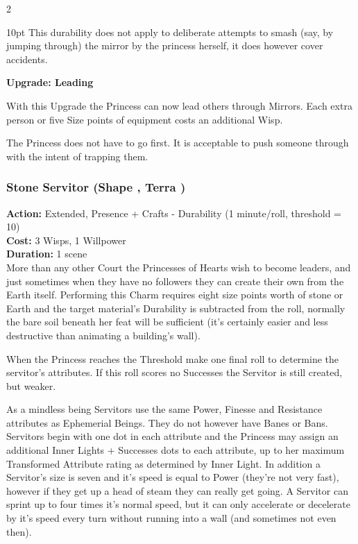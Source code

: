 \begin{multicols}{2}
\begin{myindentpar}{10pt}
This durability does not apply to deliberate attempts to smash (say, by jumping through) the mirror by the princess herself, it does however cover accidents.

\textbf{Upgrade: Leading}

With this Upgrade the Princess can now lead others through Mirrors. Each extra person or five Size points of equipment costs an additional Wisp.

The Princess does not have to go first. It is acceptable to push someone through with the intent of trapping them.\end{myindentpar}


\subsubsection*{Stone Servitor (Shape \textbullet\textbullet\textbullet\textbullet\textbullet, Terra \textbullet\textbullet\textbullet)}

\noindent \textbf{Action:} Extended, Presence + Crafts - Durability (1 minute/roll, threshold = 10)\\

\noindent \textbf{Cost:} 3 Wisps, 1 Willpower\\

\noindent \textbf{Duration:} 1 scene\\

\noindent More than any other Court the Princesses of Hearts wish to become leaders, and just sometimes when they have no followers they can create their own from the Earth itself. Performing this Charm requires eight size points worth of stone or Earth and the target material's Durability is subtracted from the roll, normally the bare soil beneath her feat will be sufficient (it's certainly easier and less destructive than animating a building's wall).

When the Princess reaches the Threshold make one final roll to determine the servitor’s attributes. If this roll scores no Successes the Servitor is still created, but weaker.

As a mindless being Servitors use the same Power, Finesse and Resistance attributes as Ephemerial Beings. They do not however have Banes or Bans. Servitors begin with one dot in each attribute and the Princess may assign an additional Inner Lights + Successes dots to each attribute, up to her maximum Transformed Attribute rating as determined by Inner Light. In addition a Servitor's size is seven and it's speed is equal to Power (they're not very fast), however if they get up a head of steam they can really get going. A Servitor can sprint up to four times it's normal speed, but it can only accelerate or decelerate by it's speed every turn without running into a wall (and sometimes not even then).


\end{multicols}
